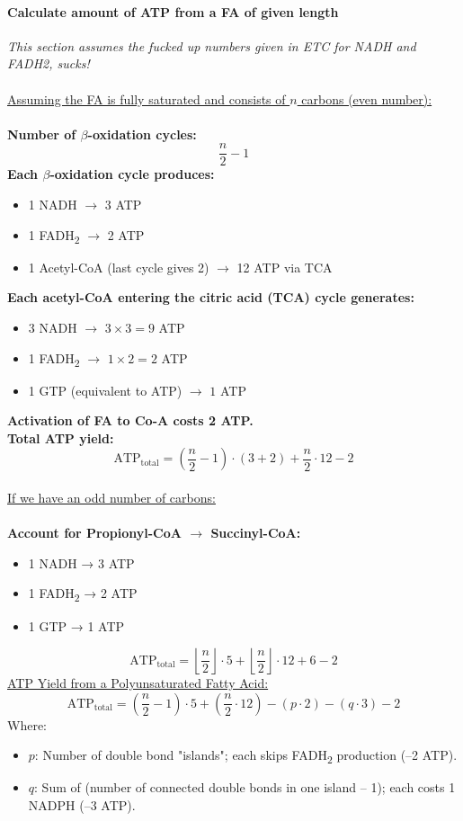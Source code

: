 \documentclass[../main.tex]{subfiles}
\begin{document}
\paragraph{Calculate amount of ATP from a FA of given length}
\textit{This section assumes the fucked up numbers given in ETC for NADH and FADH2, sucks!}\\
\\
\noindent
\underline{Assuming the FA is fully saturated and consists of \( n \) carbons (even number):}\\
\\
\textbf{Number of $\beta$-oxidation cycles:}
\[
\frac{n}{2} - 1
\]
\textbf{Each $\beta$-oxidation cycle produces:}
\begin{itemize}
	\item 1 NADH $\rightarrow$ 3 ATP
	\item 1 FADH\textsubscript{2} $\rightarrow$ 2 ATP
	\item 1 Acetyl-CoA (last cycle gives 2) $\rightarrow$ 12 ATP via TCA
\end{itemize}
\noindent
\textbf{Each acetyl-CoA entering the citric acid (TCA) cycle generates:}
\begin{itemize}
	\item 3 NADH $\rightarrow$ $3 \times 3 = 9$ ATP
	\item 1 FADH\textsubscript{2} $\rightarrow$ $1 \times 2 = 2$ ATP
	\item 1 GTP (equivalent to ATP) $\rightarrow$ $1$ ATP
\end{itemize}
\noindent
\textbf{Activation of FA to Co-A costs 2 ATP.}
\\
\textbf{Total ATP yield:}
\[
\text{ATP}_{\text{total}} = \left( \frac{n}{2} - 1 \right) \cdot (3 + 2) + \frac{n}{2} \cdot 12 - 2
\]
\noindent
\\
\underline{If we have an odd number of carbons:}\\
\\ 
\noindent
\textbf{Account for Propionyl-CoA $\rightarrow$ Succinyl-CoA:}
\begin{itemize}
	\item 1 NADH → 3 ATP
	\item 1 FADH\textsubscript{2} → 2 ATP
	\item 1 GTP → 1 ATP
\end{itemize}
\noindent
\[
\text{ATP}_{\text{total}} = \left\lfloor \frac{n}{2} \right\rfloor \cdot 5 + \left\lfloor \frac{n}{2} \right\rfloor \cdot 12 + 6 - 2
\]
\underline{ATP Yield from a Polyunsaturated Fatty Acid:}
\[
\text{ATP}_{\text{total}} = \left( \frac{n}{2} - 1 \right) \cdot 5 + \left( \frac{n}{2} \cdot 12 \right) - (p \cdot 2) - (q \cdot 3) - 2
\]
Where:
\begin{itemize}
	\item \( p \): Number of double bond "islands"; each skips FADH\textsubscript{2} production (–2 ATP).
	\item \( q \): Sum of (number of connected double bonds in one island – 1); each costs 1 NADPH (–3 ATP).
\end{itemize}
\end{document}
